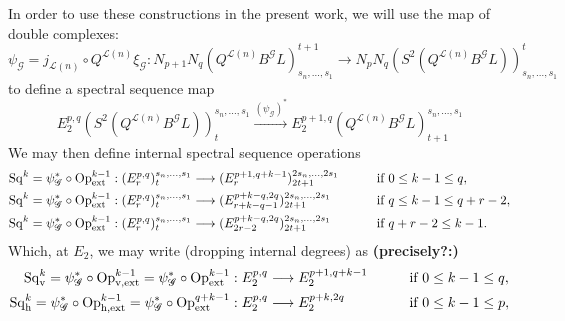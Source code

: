 \documentclass[11pt]{amsart}
\theoremstyle{plain}
\theoremstyle{definition}
\renewcommand{\to}{\longrightarrow}
\newcommand{\scrQ}{\mathscr{Q}}
\newcommand{\scrR}{\mathscr{R}}
\newcommand{\scrT}{\mathscr{T}}
\newcommand{\scrY}{\mathscr{Y}}
\newcommand{\scrI}{\mathscr{I}}
\newcommand{\scrO}{\mathscr{O}}
\newcommand{\scrP}{\mathscr{P}}
\newcommand{\scrS}{\mathscr{S}}
\newcommand{\scrG}{\mathscr{G}}
\newcommand{\scrH}{\mathscr{H}}
\newcommand{\scrJ}{\mathscr{J}}
\newcommand{\scrK}{\mathscr{K}}
\newcommand{\scrL}{\mathscr{L}}
\newcommand{\scrZ}{\mathscr{Z}}
\newcommand{\scrN}{\mathscr{N}}
\newcommand{\scrM}{\mathscr{M}}
\newcommand{\calL}{\mathcal{L}}
\theoremstyle{plain}
\newcommand{\BSW}{{\scrG}}%
\newcommand{\BSWres}{B^\BSW}%
\newcommand{\ExtCohOp}{\textup{Op}_\textup{ext}}
\newcommand{\vExtCohOp}{\textup{Op}_\textup{v,ext}}
\newcommand{\hExtCohOp}{\textup{Op}_\textup{h,ext}}
\newcommand{\Sq}{\mathrm{Sq}}
\begin{document}
\begin{Composite functor spectral sequences}
In order to use these constructions in the present work, we will use the map of double complexes:
\[\psi_{\BSW}=j_{\calL(n)}\circ Q^{\calL(n)}\xi_\BSW:N_{p+1}N_q(Q^{\calL(n)}\BSWres L)_{s_n,\ldots,s_1}^{t+1}\to N_{p}N_q(S^2(Q^{\calL(n)}\BSWres L))_{s_n,\ldots,s_1}^{t}\]
to define a spectral sequence map
\[E_2^{p,q}(S^2(Q^{\calL(n)}\BSWres L))^{s_n,\ldots,s_1}_t\overset{(\psi_\BSW)^*}{\to} E_2^{p+1,q}(Q^{\calL(n)}\BSWres L)^{s_n,\ldots,s_1}_{t+1}\]
We may then define internal spectral sequence operations
\begin{alignat*}{2}
\Sq^k=\psi_{\BSW}^*\circ\ExtCohOp^{k-1}:(E^{p,q}_r)^{s_n,\ldots,s_1}_t&\to (E^{p+1,q+k-1}_r)^{2s_n,\ldots,2s_1}_{2t+1}&\qquad&\text{if }0\leq k-1 \leq q,\\
\Sq^k=\psi_{\BSW}^*\circ\ExtCohOp^{k-1}:(E^{p,q}_r)^{s_n,\ldots,s_1}_t&\to (E^{p+k-q,2q}_{r+k-q-1})^{2s_n,\ldots,2s_1}_{2t+1}&\qquad&\text{if }q\leq k-1\leq q+r-2,\\
\Sq^k=\psi_{\BSW}^*\circ\ExtCohOp^{k-1}:(E^{p,q}_r)^{s_n,\ldots,s_1}_t&\to (E^{p+k-q,2q}_{2r-2})^{2s_n,\ldots,2s_1}_{2t+1}&\qquad&\text{if }q+r-2\leq k-1.
\end{alignat*}
Which, at $E_2$, we may write (dropping internal degrees) as \textbf{(precisely?:)}
\begin{alignat*}{2}
\Sq^k_\textup{v}=\psi_{\BSW}^*\circ\vExtCohOp^{k-1}=\psi_{\BSW}^*\circ\ExtCohOp^{k-1}:E^{p,q}_2&\to E^{p+1,q+k-1}_2&\qquad&\text{if }0\leq k-1 \leq q,\\
\Sq^k_\textup{h}=\psi_{\BSW}^*\circ\hExtCohOp^{k-1}=\psi_{\BSW}^*\circ\ExtCohOp^{q+k-1}:E^{p,q}_2&\to E^{p+k,2q}_2&\qquad&\text{if }0\leq k-1 \leq p,
\end{alignat*}


\end{Composite functor spectral sequences}
\end{document}
